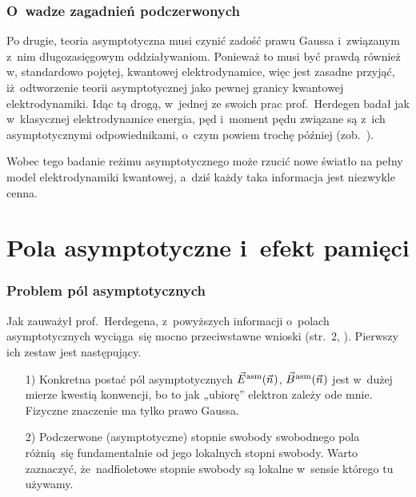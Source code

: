 \documentclass[10pt,t]{beamer}
\begin{document}
\begin{frame}
  \frametitle{O~wadze zagadnień podczerwonych}


  Po drugie, teoria asymptotyczna musi czynić zadość prawu Gaussa
  i~związanym z~nim długozasięgowym oddziaływaniom. Ponieważ to musi być
  prawdą również w, standardowo pojętej, kwantowej elektrodynamice, więc
  jest zasadne przyjąć, iż~odtworzenie teorii asymptotycznej jako pewnej
  granicy kwantowej elektrodynamiki. Idąc tą drogą, w~jednej ze swoich prac
  prof.~Herdegen badał jak w~\alert{klasycznej} elektrodynamice energia,
  pęd i~moment pędu związane są z~ich asymptotycznymi odpowiednikami,
  o~czym powiem trochę później
  (zob.~\parencite{Herdegen-Long-range-effects-in-asymptotic-ETC-Pub-1995}).

  Wobec tego badanie reżimu asymptotycznego może rzucić nowe światło
  na pełny model elektrodynamiki kwantowej, a~dziś każdy taka informacja
  jest niezwykle cenna.

\end{frame}










\section{Pola asymptotyczne i~efekt pamięci}



\begin{frame}
  \frametitle{Problem pól asymptotycznych}


  Jak zauważył prof.~Herdegena, z~powyższych informacji o~polach
  asymptotycznych wyciąga~się mocno przeciwstawne wnioski (str.~2,
  \parencite{Herdegen-Infrared-structure-beyond-locality-ETC-Ver-2024}).
  Pierwszy ich zestaw jest następujący.

  \begin{itemize}

  \item[1)] Konkretna postać pól asymptotycznych $\vec{E}^{ \hspace{0.05em} \text{asm} }( \vec{n} \hspace{0.05em} )$, $\vec{B}^{ \hspace{0.05em} \text{asm} }( \vec{n} \hspace{0.05em} )$
    jest w~dużej mierze kwestią konwencji, bo to jak „ubiorę” elektron
    zależy ode mnie. Fizyczne znaczenie ma tylko prawo Gaussa.

  \item[2)] Podczerwone (asymptotyczne) stopnie swobody swobodnego pola
    różnią~się fundamentalnie od jego lokalnych stopni swobody. Warto
    zaznaczyć, że~nadfioletowe stopnie swobody są lokalne w~sensie którego
    tu używamy.

  \end{itemize}

\end{frame}
\end{document}
